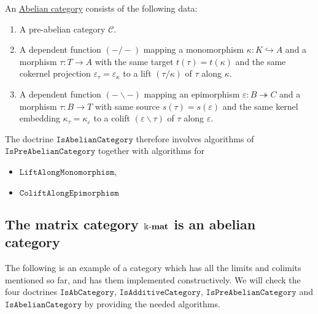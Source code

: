 \begin{definition}
An \ul{Abelian category} consists of the following data:
\begin{enumerate}
\renewcommand{\labelenumi}{(\theenumi)}
\item A pre-abelian category $\mathcal{C}$.
\item A dependent function $( - / - )$ mapping a monomorphism $\kappa : K \hookrightarrow A$ and a morphism $\tau : T \rightarrow A$ with
the same target $t(\tau) = t(\kappa)$ and the same cokernel projection $\varepsilon_{\tau} = \varepsilon_{\kappa}$ to a lift $(\tau / \kappa)$ of
$\tau$ along $\kappa$.
\item A dependent function $( - \backslash - )$ mapping an epimorphism $\varepsilon : B \twoheadrightarrow C$ and a morphism
$\tau : B \rightarrow T$ with same source $s(\tau) = s(\varepsilon)$ and the same kernel embedding $\kappa_{\tau} = \kappa_{\varepsilon}$
to a colift $(\varepsilon \backslash \tau)$ of $\tau$ along $\varepsilon$.
\end{enumerate}
\end{definition}

\begin{doctrine}
The doctrine $\mathtt{IsAbelianCategory}$ therefore involves algorithms of $\mathtt{IsPreAbelianCategory}$ together with algorithms for
\begin{itemize}
\item $\mathtt{LiftAlongMonomorphism}$,
\item $\mathtt{ColiftAlongEpimorphism}$
\end{itemize}
\end{doctrine}

\newpage
\subsection{The matrix category $\Bbbk\textnormal{-}\mathbf{mat}$ is an abelian category}

The following is an example of a category which has all the limits and colimits mentioned so far, and has them implemented constructively.
We will check the four doctrines $\mathtt{IsAbCategory}$, $\mathtt{IsAdditiveCategory}$, $\mathtt{IsPreAbelianCategory}$ and
$\mathtt{IsAbelianCategory}$ by providing the needed algorithms.

